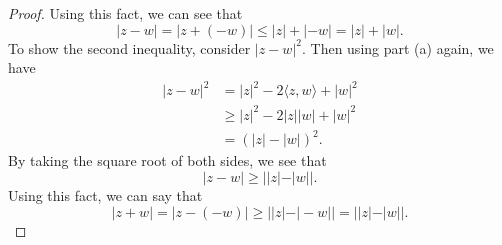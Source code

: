 \documentclass[a4paper]{article}
\begin{document}
\begin{enumerate}
\begin{proof}
Using this fact, we can see that 
\[  | z - w  |  = | z + (-w) | \leq | z  |  + | -w | = |  z  |  + | w |.  \]
To show the second inequality, consider \( | z - w  |^{2} \). Then using part (a) again, we have
\begin{align*}
    | z - w  |^{2} &= | z |^{2} - 2 \langle z , w \rangle + | w  |^{2} \\
                   & \geq | z |^{2} - 2 | z | | w |  + | w |^{2} \\ 
                   &= (| z |  - | w |)^{2}. 
\end{align*}
By taking the square root of both sides, we see that 
\[  | z - w  | \geq |  | z  |  - | w |  |.  \]
Using this fact, we can say that 
\[  | z + w  |  = | z - (-w) | \geq | | z  |  - | -w |  | = | | z  |  - | w |  |. \]
                \end{proof}
        \end{enumerate}
\end{document}
